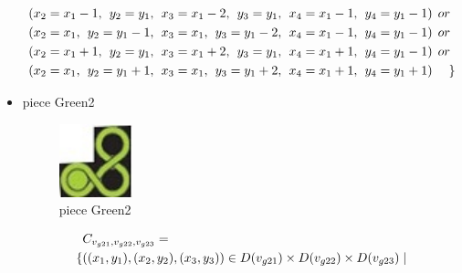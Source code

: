 \begin{appendices}
\begin{itemize}
\begin{align*}
&(x_{2} = x_{1}-1,\hspace{1ex}y_{2} = y_{1},\hspace{1ex}x_{3} = x_{1}-2, \hspace{1ex}y_{3} = y_{1},\hspace{1ex}x_{4} = x_{1}-1,\hspace{1ex}y_{4} = y_{1}-1)\hspace{1ex} or\\
&(x_{2} = x_{1},\hspace{1ex}y_{2} = y_{1}-1,\hspace{1ex}x_{3} = x_{1}, \hspace{1ex}y_{3} = y_{1}-2,\hspace{1ex}x_{4} = x_{1}-1,\hspace{1ex}y_{4} = y_{1}-1)\hspace{1ex} or\\
&(x_{2} = x_{1}+1,\hspace{1ex}y_{2} = y_{1},\hspace{1ex}x_{3} = x_{1}+2, \hspace{1ex}y_{3} = y_{1},\hspace{1ex}x_{4} = x_{1}+1,\hspace{1ex}y_{4} = y_{1}-1)\hspace{1ex} or\\
&(x_{2} = x_{1},\hspace{1ex}y_{2} = y_{1}+1,\hspace{1ex}x_{3} = x_{1}, \hspace{1ex}y_{3} = y_{1}+2,\hspace{1ex}x_{4} = x_{1}+1,\hspace{1ex}y_{4} = y_{1}+1)\hspace{3ex} \}
\end{align*}
 \item piece Green2\\
\begin{figure}[H]
    \centering
    \includegraphics[width=0.2\textwidth]{figs/green2.jpg}
    \caption{piece Green2}
\end{figure}
 \begin{align*}
&\Con{g21}{g22}{g23}=
\\\{&((x_{1},y_{1}),(x_{2},y_{2}),(x_{3},y_{3}))\in \Domain{g21}\times \Domain{g22}\times\Domain{g23}\mid\\

\end{align*}
\end{itemize}
\end{appendices}
